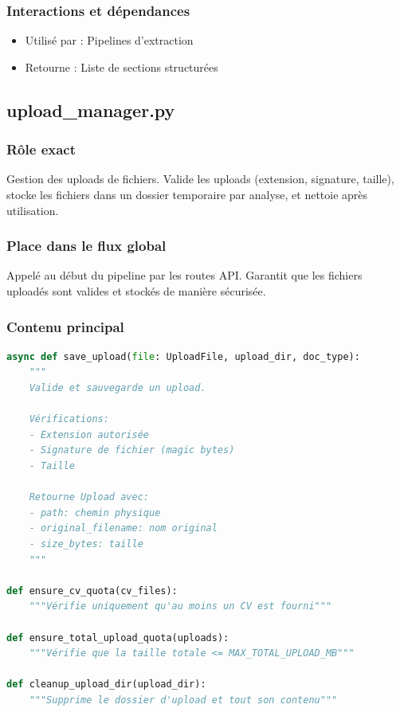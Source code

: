 \documentclass[12pt,a4paper,oneside]{book}
\begin{document}
\subsubsection{Interactions et dépendances}

\begin{itemize}
    \item Utilisé par : Pipelines d'extraction
    \item Retourne : Liste de sections structurées
\end{itemize}

\subsection{upload\_manager.py}

\subsubsection{Rôle exact}

Gestion des uploads de fichiers. Valide les uploads (extension, signature, taille), stocke les fichiers dans un dossier temporaire par analyse, et nettoie après utilisation.

\subsubsection{Place dans le flux global}

Appelé au début du pipeline par les routes API. Garantit que les fichiers uploadés sont valides et stockés de manière sécurisée.

\subsubsection{Contenu principal}

\begin{lstlisting}[language=Python]
async def save_upload(file: UploadFile, upload_dir, doc_type):
    """
    Valide et sauvegarde un upload.
    
    Vérifications:
    - Extension autorisée
    - Signature de fichier (magic bytes)
    - Taille
    
    Retourne Upload avec:
    - path: chemin physique
    - original_filename: nom original
    - size_bytes: taille
    """

def ensure_cv_quota(cv_files):
    """Vérifie uniquement qu'au moins un CV est fourni"""

def ensure_total_upload_quota(uploads):
    """Vérifie que la taille totale <= MAX_TOTAL_UPLOAD_MB"""

def cleanup_upload_dir(upload_dir):
    """Supprime le dossier d'upload et tout son contenu"""
\end{lstlisting}
\end{document}
